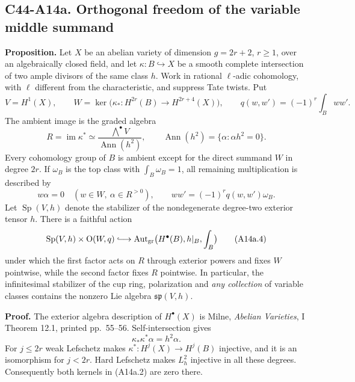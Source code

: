 \documentclass[11pt]{article}
\theoremstyle{remark}\newtheorem{remark}[theorem]{Remark}
\begin{document}
\subsection*{C44-A14a. Orthogonal freedom of the variable middle summand}

\textbf{Proposition.}
Let $X$ be an abelian variety of dimension $g=2r+2$, $r\ge1$,
over an algebraically closed field, and let
$\kappa:B\hookrightarrow X$ be a smooth complete intersection of
two ample divisors of the same class $h$. Work in rational
$\ell$-adic cohomology, with $\ell$ different from the
characteristic, and suppress Tate twists. Put
\[
 V=H^1(X),\qquad
 W=\ker\bigl(\kappa_*:H^{2r}(B)\to H^{2r+4}(X)\bigr),\qquad
 q(w,w')=(-1)^r\int_Bww'.
                                                               \tag{A14a.1}
\]
The ambient image is the graded algebra
\[
 R=\operatorname{im}\kappa^*
       \simeq\frac{\bigwedge^\bullet V}{\operatorname{Ann}(h^2)},
 \qquad
 \operatorname{Ann}(h^2)=\{\alpha:\alpha h^2=0\}.              \tag{A14a.2}
\]
Every cohomology group of $B$ is ambient except for the direct
summand $W$ in degree $2r$. If $\omega_B$ is the top class with
$\int_B\omega_B=1$, all remaining multiplication is described by
\[
   w\alpha=0\quad(w\in W,\ \alpha\in R^{>0}),\qquad
   ww'=(-1)^r q(w,w')\omega_B.                               \tag{A14a.3}
\]
Let $\operatorname{Sp}(V,h)$ denote the stabilizer of the
nondegenerate degree-two exterior tensor $h$.
There is a faithful action
\[
 \operatorname{Sp}(V,h)\times\operatorname O(W,q)
          \lhook\joinrel\longrightarrow
  \operatorname{Aut}_{\rm gr}\bigl(H^\bullet(B),h|_B,\int_B\bigr)
                                                               \tag{A14a.4}
\]
under which the first factor acts on $R$ through exterior powers
and fixes $W$ pointwise, while the second factor fixes $R$ pointwise.
In particular, the infinitesimal stabilizer of the cup ring,
polarization and \emph{any collection} of variable classes
contains the nonzero Lie algebra $\mathfrak{sp}(V,h)$.

\textbf{Proof.}
The exterior algebra description of $H^\bullet(X)$ is Milne,
\emph{Abelian Varieties}, I Theorem 12.1, printed pp.~55--56.
Self-intersection gives
\[
                         \kappa_*\kappa^*\alpha=h^2\alpha.
                                                               \tag{A14a.5}
\]
For $j\le2r$ weak Lefschetz makes $\kappa^*:H^j(X)\to H^j(B)$
injective, and it is an isomorphism for $j<2r$.
Hard Lefschetz makes $L_h^2$ injective in all these degrees.
Consequently both kernels in (A14a.2) are zero there.
\end{document}
